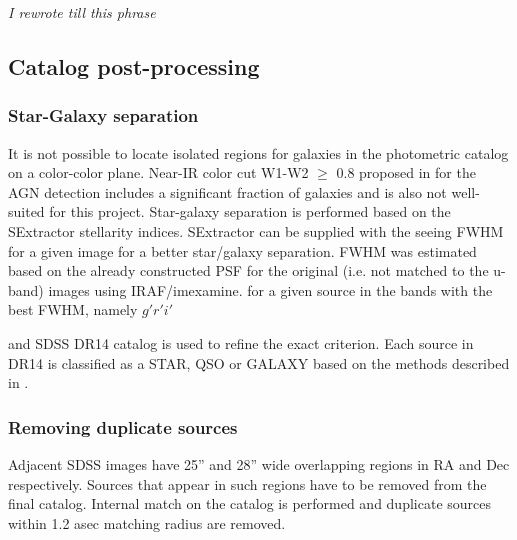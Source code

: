 \documentclass[apj,iop]{emulateapj}
\begin{document}
\textit{I rewrote till this phrase}
\subsection{Catalog post-processing}

\subsubsection{Star-Galaxy separation}
It is not possible to locate isolated regions for galaxies in the photometric catalog on a color-color plane. Near-IR color cut W1-W2 $\geqslant $ 0.8 proposed in \citet{Stern2012} for the AGN detection includes a significant fraction of galaxies and is also not well-suited for this project. Star-galaxy separation is performed based on the SExtractor stellarity indices. SExtractor can be supplied with the seeing FWHM for a given image for a better star/galaxy separation. FWHM was estimated based on the already constructed PSF for the original (i.e. not matched to the u-band) images using IRAF/imexamine. for a given source in the bands with the best FWHM, namely $g'r'i'$

and SDSS DR14 \citet{Abolfathi2018} catalog is used to refine the exact criterion.  Each source in DR14 is classified as a STAR, QSO or GALAXY based on the methods described in \citet{Bolton2012a}.
\subsubsection{Removing duplicate sources}

Adjacent SDSS images have 25'' and 28'' wide overlapping regions in RA and Dec respectively. Sources that appear in such regions have to be removed from the final catalog. Internal match on the catalog is performed and duplicate sources within 1.2 asec matching radius are removed.
\end{document}
